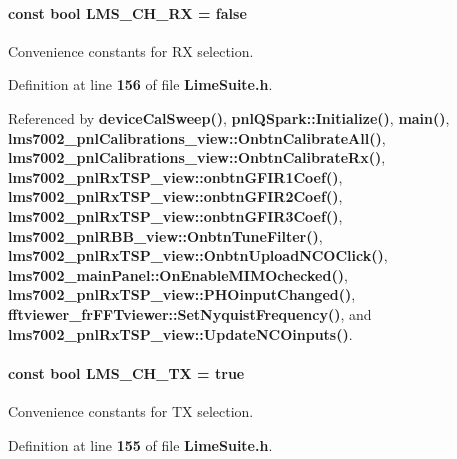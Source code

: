 \paragraph[{L\+M\+S\+\_\+\+C\+H\+\_\+\+RX}]{\setlength{\rightskip}{0pt plus 5cm}const bool L\+M\+S\+\_\+\+C\+H\+\_\+\+RX = false\hspace{0.3cm}{\ttfamily [static]}}\label{group__FN__HIGH__LVL_ga6315347ecc9dbff0d1ead974be3e8885}


Convenience constants for RX selection. 



Definition at line {\bf 156} of file {\bf Lime\+Suite.\+h}.



Referenced by {\bf device\+Cal\+Sweep()}, {\bf pnl\+Q\+Spark\+::\+Initialize()}, {\bf main()}, {\bf lms7002\+\_\+pnl\+Calibrations\+\_\+view\+::\+Onbtn\+Calibrate\+All()}, {\bf lms7002\+\_\+pnl\+Calibrations\+\_\+view\+::\+Onbtn\+Calibrate\+Rx()}, {\bf lms7002\+\_\+pnl\+Rx\+T\+S\+P\+\_\+view\+::onbtn\+G\+F\+I\+R1\+Coef()}, {\bf lms7002\+\_\+pnl\+Rx\+T\+S\+P\+\_\+view\+::onbtn\+G\+F\+I\+R2\+Coef()}, {\bf lms7002\+\_\+pnl\+Rx\+T\+S\+P\+\_\+view\+::onbtn\+G\+F\+I\+R3\+Coef()}, {\bf lms7002\+\_\+pnl\+R\+B\+B\+\_\+view\+::\+Onbtn\+Tune\+Filter()}, {\bf lms7002\+\_\+pnl\+Rx\+T\+S\+P\+\_\+view\+::\+Onbtn\+Upload\+N\+C\+O\+Click()}, {\bf lms7002\+\_\+main\+Panel\+::\+On\+Enable\+M\+I\+M\+Ochecked()}, {\bf lms7002\+\_\+pnl\+Rx\+T\+S\+P\+\_\+view\+::\+P\+H\+Oinput\+Changed()}, {\bf fftviewer\+\_\+fr\+F\+F\+Tviewer\+::\+Set\+Nyquist\+Frequency()}, and {\bf lms7002\+\_\+pnl\+Rx\+T\+S\+P\+\_\+view\+::\+Update\+N\+C\+Oinputs()}.

\paragraph[{L\+M\+S\+\_\+\+C\+H\+\_\+\+TX}]{\setlength{\rightskip}{0pt plus 5cm}const bool L\+M\+S\+\_\+\+C\+H\+\_\+\+TX = true\hspace{0.3cm}{\ttfamily [static]}}\label{group__FN__HIGH__LVL_ga8b66470dd0604888079174a9f9a96daa}


Convenience constants for TX selection. 



Definition at line {\bf 155} of file {\bf Lime\+Suite.\+h}.




